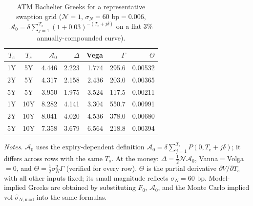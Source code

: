 \begin{table}[H]
\centering
\caption{ATM Bachelier Greeks for a representative swaption grid (\(\mathcal N=1\), \(\sigma_N=60\) bp\(=0.006\), \(\mathcal A_0=\delta\sum_{j=1}^{T_s}(1+0.03)^{-(T_e+j\delta)}\) on a flat 3\% annually-compounded curve).}
\label{tab:atm_greeks}
\begin{tabular}{@{}ccrrrrr@{}}
\toprule
\(T_e\) & \(T_s\) & \(\mathcal A_0\) & \(\Delta\) & Vega & \(\Gamma\) & \(\Theta\) \\
\midrule
1Y & 5Y & 4.446 & 2.223 & 1.774 & 295.6 & 0.00532 \\
2Y & 5Y & 4.317 & 2.158 & 2.436 & 203.0 & 0.00365 \\
5Y & 5Y & 3.950 & 1.975 & 3.524 & 117.5 & 0.00211 \\
1Y & 10Y & 8.282 & 4.141 & 3.304 & 550.7 & 0.00991 \\
2Y & 10Y & 8.041 & 4.020 & 4.536 & 378.0 & 0.00680 \\
5Y & 10Y & 7.358 & 3.679 & 6.564 & 218.8 & 0.00394 \\
\bottomrule
\end{tabular}
\begin{tablenotes}
\small
\item \textit{Notes.} \(\mathcal A_0\) uses the expiry-dependent definition \(\mathcal A_0=\delta\sum_{j=1}^{T_s}P(0,T_e+j\delta)\); it differs across rows with the same \(T_s\). At the money: \(\Delta=\tfrac12\mathcal N\mathcal A_0\), Vanna\(=\)Volga\(=0\), and \(\Theta=\tfrac12\sigma_N^2\Gamma\) (verified for every row). \(\Theta\) is the partial derivative \(\partial V/\partial T_e\) with all other inputs fixed; its small magnitude reflects \(\sigma_N=60\) bp. Model-implied Greeks are obtained by substituting \(F_0\), \(\mathcal A_0\), and the Monte Carlo implied vol \(\widehat\sigma_{N,\mathrm{mod}}\) into the same formulas.
\end{tablenotes}
\end{table}
